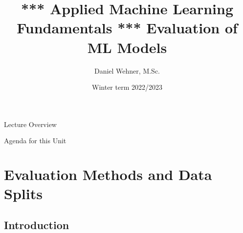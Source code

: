 


\title[Evaluation of ML Models]{*** Applied Machine Learning Fundamentals *** Evaluation of ML Models}
\author{Daniel Wehner, M.Sc.}
\date{Winter term 2022/2023}




\maketitlepage


\begin{frame}{Lecture Overview}{}
\end{frame}


\begin{frame}{Agenda for this Unit}
	\begin{multicols}{2}
		\tableofcontents
	\end{multicols}
\end{frame}


\section{Evaluation Methods and Data Splits}

\subsection{Introduction}

